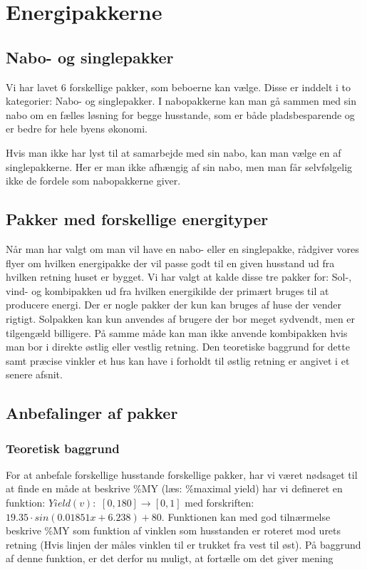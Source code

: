 \documentclass[12pt,a4paper]{article}
\theoremstyle{break}
\theoremstyle{nonumberplain}
\begin{document}
\section{Energipakkerne}
\subsection{Nabo- og singlepakker}
Vi har lavet 6 forskellige pakker, som beboerne kan vælge. Disse er inddelt i to kategorier: Nabo- og singlepakker.
I nabopakkerne kan man gå sammen med sin nabo om en fælles løsning for begge husstande, som er både pladsbesparende og er bedre for hele byens økonomi. 

Hvis man ikke har lyst til at samarbejde med sin nabo, kan man vælge en af singlepakkerne. 
Her er man ikke afhængig af sin nabo, men man får selvfølgelig ikke de fordele som nabopakkerne giver. 

\subsection{Pakker med forskellige energityper}
Når man har valgt om man vil have en nabo- eller en singlepakke, rådgiver vores flyer om hvilken energipakke der vil passe godt til en given husstand ud fra hvilken retning huset er bygget. 
Vi har valgt at kalde disse tre pakker for: Sol-, vind- og kombipakken ud fra hvilken energikilde der primært bruges til at producere energi. 
Der er nogle pakker der kun kan bruges af huse der vender rigtigt. Solpakken kan kun anvendes af brugere der bor meget sydvendt, men er tilgengæld billigere. 
På samme måde kan man ikke anvende kombipakken hvis man bor i direkte østlig eller vestlig retning. 
Den teoretiske baggrund for dette samt præcise vinkler et hus kan have i forholdt til østlig retning er angivet i et senere afsnit.  

\pagebreak

\subsection{Anbefalinger af pakker}
\subsubsection{Teoretisk baggrund}
For at anbefale forskellige husstande forskellige pakker, har vi været nødsaget til at finde en måde at beskrive \%MY (læs: \%maximal yield) har vi defineret en funktion: $Yield(v):$  $[0,180] \rightarrow [0,1]$ med forskriften: $19.35 \cdot sin(0.01851x + 6.238) + 80$. 
Funktionen kan med god tilnærmelse beskrive \%MY som funktion af vinklen som husstanden er roteret mod urets retning (Hvis linjen der måles vinklen til er trukket fra vest til øst). 
På baggrund af denne funktion, er det derfor nu muligt, at fortælle om det giver mening 
\end{document}

